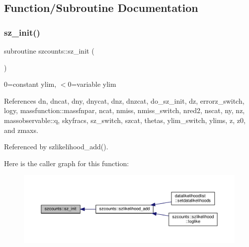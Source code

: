 \subsection{Function/\+Subroutine Documentation}
\mbox{\label{namespaceszcounts_afa324b0c4ff10f2122b6d75541b4e204}} 
\subsubsection{\texorpdfstring{sz\+\_\+init()}{sz\_init()}}
{\footnotesize\ttfamily subroutine szcounts\+::sz\+\_\+init (\begin{DoxyParamCaption}{ }\end{DoxyParamCaption})\hspace{0.3cm}{\ttfamily [private]}}

0=constant ylim, $<$0=variable ylim 

References dn, dncat, dny, dnycat, dnz, dnzcat, do\+\_\+sz\+\_\+init, dz, errorz\+\_\+switch, logy, massfunction\+::massfnpar, ncat, nmiss, nmiss\+\_\+switch, nred2, nscat, ny, nz, massobservable\+::q, skyfracs, sz\+\_\+switch, szcat, thetas, ylim\+\_\+switch, ylims, z, z0, and zmaxs.



Referenced by szlikelihood\+\_\+add().

Here is the caller graph for this function\+:
\nopagebreak
\begin{figure}[H]
\begin{center}
\leavevmode
\includegraphics[width=350pt]{namespaceszcounts_afa324b0c4ff10f2122b6d75541b4e204_icgraph}
\end{center}
\end{figure}
\mbox{\label{namespaceszcounts_abc28ab0b8d2db0b6f91aa9b99cac694f}} 
